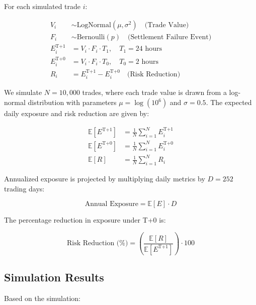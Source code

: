 \documentclass[conference]{IEEEtran}
\begin{document}
For each simulated trade $i$:

\begin{align}
    V_i &\sim \text{LogNormal}(\mu, \sigma^2) \quad \text{(Trade Value)} \\
    F_i &\sim \text{Bernoulli}(p) \quad \text{(Settlement Failure Event)} \\
    E_i^{\text{T+1}} &= V_i \cdot F_i \cdot T_{1}, \quad T_{1} = 24 \text{ hours} \\
    E_i^{\text{T+0}} &= V_i \cdot F_i \cdot T_{0}, \quad T_{0} = 2 \text{ hours} \\
    R_i &= E_i^{\text{T+1}} - E_i^{\text{T+0}} \quad \text{(Risk Reduction)}
\end{align}

We simulate $N = 10{,}000$ trades, where each trade value is drawn from a log-normal distribution with parameters $\mu = \log(10^6)$ and $\sigma = 0.5$. The expected daily exposure and risk reduction are given by:


\begin{align}
    \mathbb{E}[E^{\text{T+1}}] &= \frac{1}{N} \sum_{i=1}^{N} E_i^{\text{T+1}} \\
    \mathbb{E}[E^{\text{T+0}}] &= \frac{1}{N} \sum_{i=1}^{N} E_i^{\text{T+0}} \\
    \mathbb{E}[R] &= \frac{1}{N} \sum_{i=1}^{N} R_i
\end{align}

Annualized exposure is projected by multiplying daily metrics by $D = 252$ trading days:

\begin{equation}
    \text{Annual Exposure} = \mathbb{E}[E] \cdot D
\end{equation}

The percentage reduction in exposure under T+0 is:

\begin{equation}
    \text{Risk Reduction (\%)} = \left( \frac{\mathbb{E}[R]}{\mathbb{E}[E^{\text{T+1}}]} \right) \cdot 100
\end{equation}

\subsection{Simulation Results}

Based on the simulation:
\end{document}
